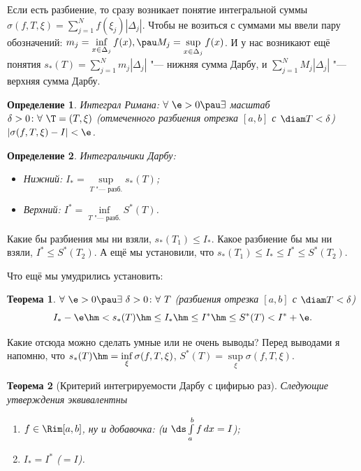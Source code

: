 \documentclass[a4paper,10pt,twoside]{article}
\newtheorem{Def}{Определение}[section]
\newtheorem{The}{Теорема}[section]
\begin{document}
 
 Если есть разбиение, то сразу возникает понятие интегральной суммы $\sigma(f,T,\xi)=\sum\limits_{j=1}^Nf(\xi_j)|\Delta_j|$. Чтобы не возиться с 
 суммами мы ввели пару обозначений: $m_j=\inf\limits_{x\in\Delta_j}f(x),\pau M_j=\sup\limits_{x\in\Delta_j}f(x)$.
 И у нас возникают ещё понятия $s_*(T)=\sum\limits_{j=1}^Nm_j|\Delta_j|$ "--- нижняя сумма Дарбу, и $\sum\limits_{j=1}^NM_j|\Delta_j|$ "--- верхняя сумма Дарбу.
 
 \begin{Def}
 	Интеграл Римана: $\forall\ \e>0\pau\exists$ масштаб $\delta>0\colon\forall\ \T=(T,\xi)$ (отмеченного разбиения отрезка $[a,b]$ с $\diam T<\delta$) 
 	$|\sigma(f,T,\xi)-I|<\e$.
 \end{Def}
 
 \begin{Def}
 	Интегральчики Дарбу:
 	\begin{itemize}
 	  \item Нижний: $I_*=\sup\limits_{T\text{ "--- разб.}}s_*(T)$;
 	  \item Верхний: $I^*=\inf\limits_{T\text{ "--- разб.}} S^*(T)$.
 	\end{itemize}
 \end{Def}
 
 Какие бы разбиения мы ни взяли, $s_*(T_1)\leq I_*$. Какое разбиение бы мы ни взяли, $I^*\leq S^*(T_2)$. А ещё мы установили, что $s_*(T_1)\leq I_*\leq I^*\leq S^*(T_2)$.
 
 Что ещё мы умудрились установить:
 
 \begin{The}
 	$\forall\ \e>0\pau\exists\ \delta>0\colon\forall\  T$ (разбиения отрезка $[a,b]$ с $\diam T<\delta$) 
 	\[I_*-\e\hm<s_*(T)\hm\leq I_*\hm\leq I^*\hm\leq S^*(T)<I^*+\e.\]
 \end{The}
 
 Какие отсюда можно сделать умные или не очень выводы? Перед выводами я напомню, что $s_*(T)\hm=\inf\limits_{\xi}\sigma(f,T,\xi)$, $S^*(T)=\sup\limits_{\xi}\sigma(f,T,\xi)$.
 
 \begin{The}[Критерий интегрируемости Дарбу с цифирью раз]\label{cifir1}
 	Следующие утверждения эквивалентны
 		\begin{enumerate}
 		  \item $f\in\Rim[a,b]$, ну и добавочка: (и $\ds\int\limits_a^b f\,dx=I$);
 		  \item $I_*=I^*$ ($=I$).
 		\end{enumerate}
 \end{The}
 
\end{document}

